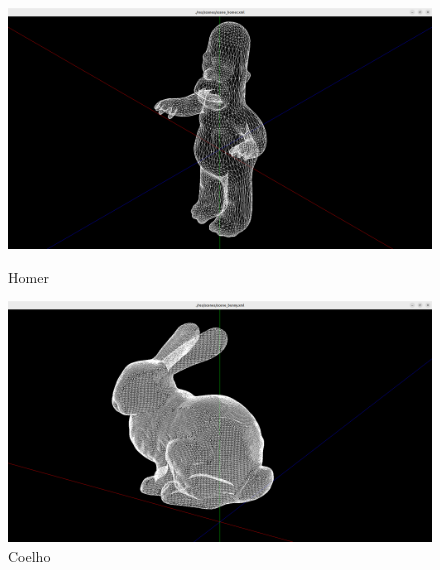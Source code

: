 \documentclass[12pt, a4paper]{article}
\begin{document}
\begin{figure}[h]
    \centering
    \begin{minipage}{0.48\textwidth}
        \centering
        \includegraphics[width=\textwidth]{res/results/Homer.png}
        \caption{Homer}
        \label{fig:imageHomer}
    \end{minipage}\hfill
    \begin{minipage}{0.48\textwidth}
        \centering
        \includegraphics[width=\textwidth]{res/results/Bunny.png}
        \caption{Coelho}
        \label{fig:imageBunny}
    \end{minipage}
\end{figure}
\end{document}
